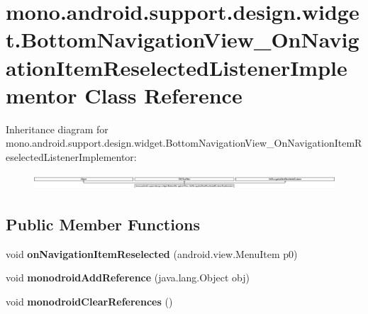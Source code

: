 \hypertarget{classmono_1_1android_1_1support_1_1design_1_1widget_1_1_bottom_navigation_view___on_navigation_ibc61d53e910ce9033a3261f22503637c}{}\section{mono.\+android.\+support.\+design.\+widget.\+Bottom\+Navigation\+View\+\_\+\+On\+Navigation\+Item\+Reselected\+Listener\+Implementor Class Reference}
\label{classmono_1_1android_1_1support_1_1design_1_1widget_1_1_bottom_navigation_view___on_navigation_ibc61d53e910ce9033a3261f22503637c}
Inheritance diagram for mono.\+android.\+support.\+design.\+widget.\+Bottom\+Navigation\+View\+\_\+\+On\+Navigation\+Item\+Reselected\+Listener\+Implementor\+:\begin{figure}[H]
\begin{center}
\leavevmode
\includegraphics[height=0.589784cm]{classmono_1_1android_1_1support_1_1design_1_1widget_1_1_bottom_navigation_view___on_navigation_ibc61d53e910ce9033a3261f22503637c}
\end{center}
\end{figure}
\subsection*{Public Member Functions}
\begin{DoxyCompactItemize}
\item 
\mbox{\label{classmono_1_1android_1_1support_1_1design_1_1widget_1_1_bottom_navigation_view___on_navigation_ibc61d53e910ce9033a3261f22503637c_a97f63c614da455d7565ed717008441d5}} 
void {\bfseries on\+Navigation\+Item\+Reselected} (android.\+view.\+Menu\+Item p0)
\item 
\mbox{\label{classmono_1_1android_1_1support_1_1design_1_1widget_1_1_bottom_navigation_view___on_navigation_ibc61d53e910ce9033a3261f22503637c_a6ad94b3297cb5542f2e5e7c5dc6639d2}} 
void {\bfseries monodroid\+Add\+Reference} (java.\+lang.\+Object obj)
\item 
\mbox{\label{classmono_1_1android_1_1support_1_1design_1_1widget_1_1_bottom_navigation_view___on_navigation_ibc61d53e910ce9033a3261f22503637c_a5d09bb6c88dcc41be8479b8f930508ec}} 
void {\bfseries monodroid\+Clear\+References} ()
\end{DoxyCompactItemize}
